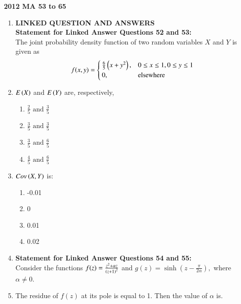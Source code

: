 \documentclass[journal]{IEEEtran}
\begin{document}
    
        \textbf{2012 MA 53 to 65}\\
\begin{enumerate}
\item[]{
	    \textbf{LINKED QUESTION AND ANSWERS}\\
\textbf{Statement for Linked Answer Questions 52 and 53:} \\
The joint probability density function of two random variables $X$ and $Y$ is given as
\[
f(x,y) = 
\begin{cases}
	\frac{6}{5}\left(x+y^2\right), & 0\leq x\leq 1,0\leq y\leq 1 \\
	0, & \text{elsewhere}
\end{cases}
\]}
	\item{
		$E\left(X\right) $
		and
		$ E\left(Y\right) $
		are, respectively,\text{  }\hfill
		
		\begin{multicols}{4}
			\begin{enumerate}
				\item $\frac{2}{5} \text{ and } \frac{3}{5}$
				
				\item $\frac{3}{5} \text{ and } \frac{3}{5}$
				
				\item $\frac{3}{5} \text{ and } \frac{6}{5}$
				
				\item $\frac{4}{5} \text{ and } \frac{6}{5}$
			\end{enumerate}
		\end{multicols}
	}
   	\item{
    	$Cov\left(X,Y\right)$ is: \text{  }\hfill
    	
    	\begin{multicols}{4}
    		\begin{enumerate}
    			\item -0.01 
    			
    			\item 0
    			
    			\item 0.01 
    			
    			\item 0.02
    		\end{enumerate}
    	\end{multicols}
    }
\item[]{
 \textbf{Statement for Linked Answer Questions 54 and 55:}\\
 Consider the functions
 $
 f(z) = \frac{z^2 + \alpha z}{\left(z+1\right)^2}
 $
 and
 $
 g(z) = \sinh(z - \frac{{\pi}}{{2\alpha}}),
 $
 where $\alpha \neq 0$.}
    \item{
            The residue of $f(z)$ at its pole is equal to 1. Then the value of $\alpha$ is.
                
}
\end{enumerate}
\end{document}
